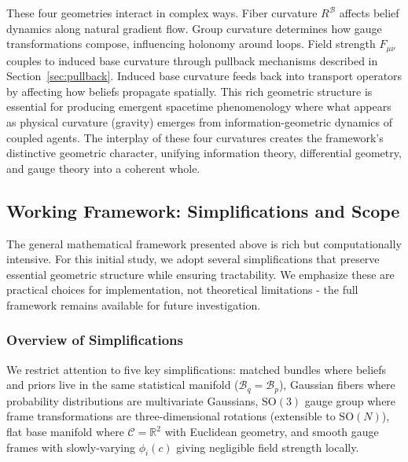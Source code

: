 \documentclass[11pt]{article}
\begin{document}
These four geometries interact in complex ways. Fiber curvature $R^\mathcal{B}$ affects belief dynamics along natural gradient flow. Group curvature determines how gauge transformations compose, influencing holonomy around loops. Field strength $F_{\mu\nu}$ couples to induced base curvature through pullback mechanisms described in Section~\ref{sec:pullback}. Induced base curvature feeds back into transport operators by affecting how beliefs propagate spatially. This rich geometric structure is essential for producing emergent spacetime phenomenology where what appears as physical curvature (gravity) emerges from information-geometric dynamics of coupled agents. The interplay of these four curvatures creates the framework's distinctive geometric character, unifying information theory, differential geometry, and gauge theory into a coherent whole.


\subsection{Working Framework: Simplifications and Scope}

The general mathematical framework presented above is rich but computationally intensive. For this initial study, we adopt several simplifications that preserve essential geometric structure while ensuring tractability. We emphasize these are practical choices for implementation, not theoretical limitations - the full framework remains available for future investigation.

\subsubsection{Overview of Simplifications}

We restrict attention to five key simplifications: matched bundles where beliefs and priors live in the same statistical manifold ($\mathcal{B}_q = \mathcal{B}_p$), Gaussian fibers where probability distributions are multivariate Gaussians, $\mathrm{SO}(3)$ gauge group where frame transformations are three-dimensional rotations (extensible to $\mathrm{SO}(N)$), flat base manifold where $\mathcal{C} = \mathbb{R}^2$ with Euclidean geometry, and smooth gauge frames with slowly-varying $\phi_i(c)$ giving negligible field strength locally.
\end{document}
